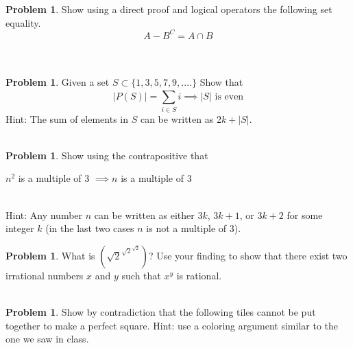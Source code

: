 \documentclass[10pt,leqno ]{article}
\theoremstyle{definition}
\newtheorem{problem}[theorem]{Problem}
\begin{document}
\begin{problem} Show using a direct proof and logical operators the following set equality.
$$A - B^C = A \cap B$$
\\\\
\Large

\end{problem}
\newpage


\begin{problem} Given a set $S \subset \{1, 3, 5, 7, 9, .\dots \}$ Show that
$$ |P(S)| =  \sum_{i \in S}^{}i \implies |S| \text{ is even}$$
Hint:  The sum of elements in $S$ can be written as $2k+|S|$.
\\\\
\Large
\end{problem}
\newpage


\begin{problem} Show using the contrapositive that
\begin{center}
$n^2$ is a multiple of 3 $\implies n$ is a multiple of 3
\end{center}
\\
Hint:  Any number $n$ can be written as either $3k$,  $3k+ 1$,  or $3k+ 2$ for some integer $k$ (in the last two cases $n$ is not a multiple of 3).
\Large

\end{problem}
\newpage


\begin{problem} What is $(\sqrt{2}^{\sqrt{2}^{\sqrt{2}}})$?  Use your finding to show that there exist two irrational numbers $x$ and $y$ such that $x^y$ is rational.
\\\\
\Large

\end{problem}
\newpage


\begin{problem} Show  by  contradiction  that  the  following  tiles  cannot  be  put  together  to make a perfect square.  Hint:  use a coloring argument similar to the one we saw in class.
\\\\
\Large

\end{problem}
\newpage
\end{document}
